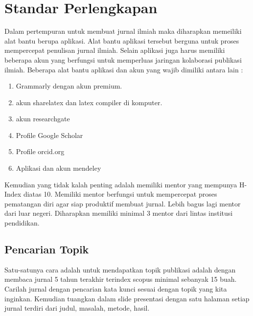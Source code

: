 \chapter{Standar Perlengkapan}

Dalam pertempuran untuk membuat jurnal ilmiah maka diharapkan memeiliki alat bantu berupa aplikasi. Alat bantu aplikasi tersebut berguna untuk proses mempercepat penulisan jurnal ilmiah. Selain aplikasi juga harus memiliki beberapa akun yang berfungsi untuk memperluas jaringan kolaborasi publikasi ilmiah. Beberapa alat bantu aplikasi dan akun yang wajib dimiliki antara lain :
\begin{enumerate}
\item Grammarly dengan akun premium.
\item akun sharelatex dan latex compiler di komputer.
\item akun researchgate
\item Profile Google Scholar
\item Profile orcid.org
\item Aplikasi dan akun mendeley
\end{enumerate}
Kemudian yang tidak kalah penting adalah memiliki mentor yang mempunya H-Index diatas 10. Memiliki mentor berfungsi untuk mempercepat proses pematangan diri agar siap produktif membuat jurnal. Lebih bagus lagi mentor dari luar negeri. Diharapkan memiliki minimal 3 mentor dari lintas institusi pendidikan.

\section{Pencarian Topik}
Satu-satunya cara adalah untuk mendapatkan topik publikasi adalah dengan membaca jurnal 5 tahun terakhir terindex scopus minimal sebanyak 15 buah. Carilah jurnal dengan pencarian  kata kunci sesuai dengan topik yang kita inginkan. Kemudian tuangkan dalam slide presentasi dengan satu halaman setiap jurnal terdiri dari judul, masalah, metode, hasil.
